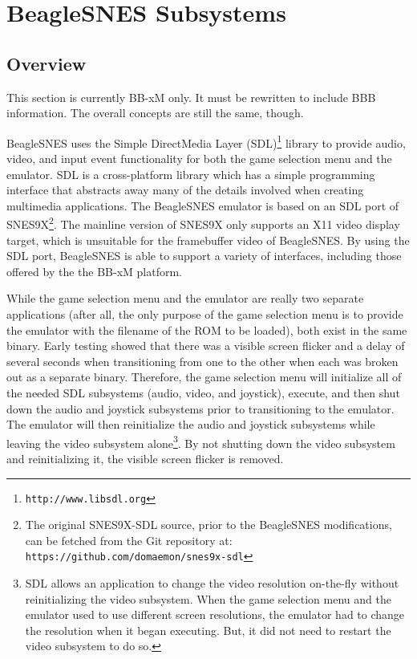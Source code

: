 \chapter{BeagleSNES Subsystems}

\section{Overview}

\begin{updateWarn}
This section is currently BB-xM only.  It must be rewritten to include BBB information.  The overall concepts are still the same, though.
\end{updateWarn}

BeagleSNES uses the Simple DirectMedia Layer (SDL)\footnote{\texttt{http://www.libsdl.org}} library to provide audio, video, and input event functionality for both the game selection menu and the emulator.  SDL is a cross-platform library which has a simple programming interface that abstracts away many of the details involved when creating multimedia applications.  The BeagleSNES emulator is based on an SDL port of SNES9X\footnote{The original SNES9X-SDL source, prior to the BeagleSNES modifications, can be fetched from the Git repository at: \texttt{https://github.com/domaemon/snes9x-sdl}}.  The mainline version of SNES9X only supports an X11 video display target, which is unsuitable for the framebuffer video of BeagleSNES.  By using the SDL port, BeagleSNES is able to support a variety of interfaces, including those offered by the the BB-xM platform.

While the game selection menu and the emulator are really two separate applications (after all, the only purpose of the game selection menu is to provide the emulator with the filename of the ROM to be loaded), both exist in the same binary.  Early testing showed that there was a visible screen flicker and a delay of several seconds when transitioning from one to the other when each was broken out as a separate binary.  Therefore, the game selection menu will initialize all of the needed SDL subsystems (audio, video, and joystick), execute, and then shut down the audio and joystick subsystems prior to transitioning to the emulator.  The emulator will then reinitialize the audio and joystick subsystems while leaving the video subsystem alone\footnote{SDL allows an application to change the video resolution on-the-fly without reinitializing the video subsystem.  When the game selection menu and the emulator used to use different screen resolutions, the emulator had to change the resolution when it began executing.  But, it did not need to restart the video subsystem to do so.}.  By not shutting down the video subsystem and reinitializing it, the visible screen flicker is removed.
 
